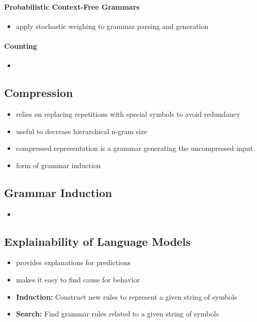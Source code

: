 \paragraph{Probabilistic Context-Free Grammars}
\begin{itemize}
    \item apply stochastic weighing to grammar parsing and generation
\end{itemize}
\paragraph{Counting}
\begin{itemize}
    \item 
\end{itemize}
\subsection{Compression}
\begin{itemize}
    \item relies on replacing repetitions with special symbols to avoid redundancy
    \item useful to decrease hierarchical n-gram size
    \item compressed representation is a grammar generating the uncompressed input
    \item form of grammar induction
\end{itemize}
\subsection{Grammar Induction}
\begin{itemize}
    \item
\end{itemize}
\subsection{Explainability of Language Models}
\begin{itemize}
    \item provides explanations for predictions
    \item makes it easy to find cause for behavior
\end{itemize}

\begin{itemize}
    \item \textbf{Induction:} Construct new rules to represent a given string of symbols
    \item \textbf{Search:} Find grammar rules related to a given string of symbols
\end{itemize}


